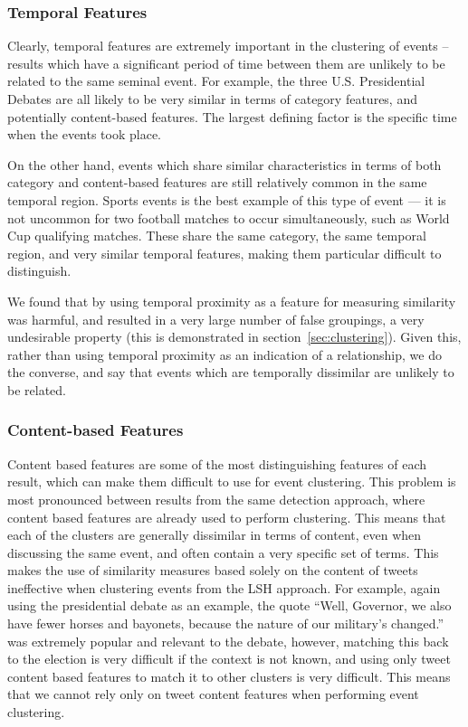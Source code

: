 \subsubsection{Temporal Features}
Clearly, temporal features are extremely important in the clustering of events -- results which have a significant period of time between them are unlikely to be related to the same seminal event.
For example, the three U.S. Presidential Debates are all likely to be very similar in terms of category features, and potentially content-based features.
The largest defining factor is the specific time when the events took place.

On the other hand, events which share similar characteristics in terms of both category and content-based features are still relatively common in the same temporal region.
Sports events is the best example of this type of event --- it is not uncommon for two football matches to occur simultaneously, such as World Cup qualifying matches.
These share the same category, the same temporal region, and very similar temporal features, making them particular difficult to distinguish.

We found that by using temporal proximity as a feature for measuring similarity was harmful, and resulted in a very large number of false groupings, a very undesirable property (this is demonstrated in section~\ref{sec:clustering}).
Given this, rather than using temporal proximity as an indication of a relationship, we do the converse, and say that events which are temporally dissimilar are unlikely to be related.

\subsubsection{Content-based Features}
Content based features are some of the most distinguishing features of each result, which can make them difficult to use for event clustering.
This problem is most pronounced between results from the same detection approach, where content based features are already used to perform clustering.
This means that each of the clusters are generally dissimilar in terms of content, even when discussing the same event, and often contain a very specific set of terms.
This makes the use of similarity measures based solely on the content of tweets  ineffective when clustering events from the LSH approach.
For example, again using the presidential debate as an example, the quote ``Well, Governor, we also have fewer horses and bayonets, because the nature of our military's changed.'' was extremely popular and relevant to the debate, however, matching this back to the election is very difficult if the context is not known, and using only tweet content based features to match it to other clusters is very difficult.
This means that we cannot rely only on tweet content features when performing event clustering.

